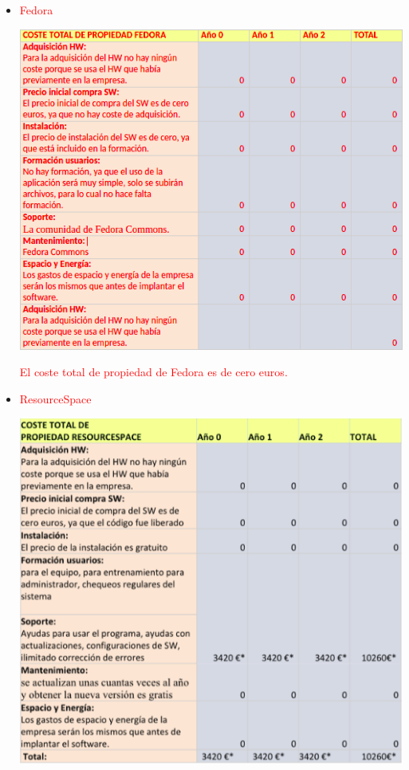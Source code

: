 \documentclass{article}
\begin{document}
\begin{itemize}
\item \textcolor{Red}{Fedora}
\begin{center}
\includegraphics[scale=0.5]{images/fedora.png}
\end{center}
\textcolor{Red}{El coste total de propiedad de Fedora es de cero euros.}
\item \textcolor{Red}{ResourceSpace}
\begin{center}
\includegraphics[scale=0.5]{images/rs.png}

\end{center}
\end{itemize}
\end{document}
